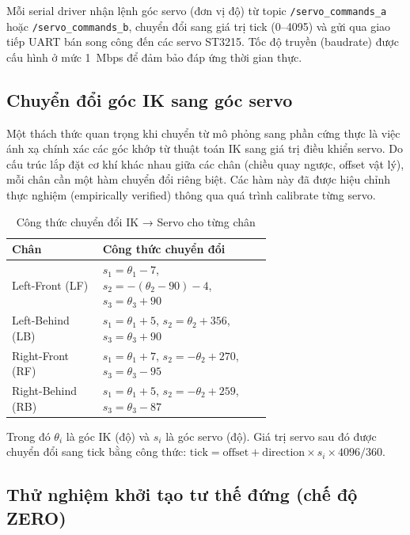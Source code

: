 Mỗi serial driver nhận lệnh góc servo (đơn vị độ) từ topic \texttt{/servo\_}\allowbreak\texttt{commands\_}\allowbreak\texttt{a} hoặc \texttt{/servo\_}\allowbreak\texttt{commands\_}\allowbreak\texttt{b}, chuyển đổi sang giá trị tick (0--4095) và gửi qua giao tiếp UART bán song công đến các servo ST3215. Tốc độ truyền (baudrate) được cấu hình ở mức 1~Mbps để đảm bảo đáp ứng thời gian thực.

\subsection{Chuyển đổi góc IK sang góc servo}

Một thách thức quan trọng khi chuyển từ mô phỏng sang phần cứng thực là việc ánh xạ chính xác các góc khớp từ thuật toán IK sang giá trị điều khiển servo. Do cấu trúc lắp đặt cơ khí khác nhau giữa các chân (chiều quay ngược, offset vật lý), mỗi chân cần một hàm chuyển đổi riêng biệt. Các hàm này đã được hiệu chỉnh thực nghiệm (empirically verified) thông qua quá trình calibrate từng servo.

\begin{table}[H]
\centering
\caption{Công thức chuyển đổi IK → Servo cho từng chân}
\label{tab:ik_to_servo}
\renewcommand{\arraystretch}{1.5}
\begin{tabular}{|l|p{0.65\linewidth}|}
\hline
\textbf{Chân} & \textbf{Công thức chuyển đổi} \\ \hline
Left-Front (LF) & $s_1 = \theta_1 - 7$, \quad $s_2 = -(\theta_2 - 90) - 4$, \quad $s_3 = \theta_3 + 90$ \\ \hline
Left-Behind (LB) & $s_1 = \theta_1 + 5$, \quad $s_2 = \theta_2 + 356$, \quad $s_3 = \theta_3 + 90$ \\ \hline
Right-Front (RF) & $s_1 = \theta_1 + 7$, \quad $s_2 = -\theta_2 + 270$, \quad $s_3 = \theta_3 - 95$ \\ \hline
Right-Behind (RB) & $s_1 = \theta_1 + 5$, \quad $s_2 = -\theta_2 + 259$, \quad $s_3 = \theta_3 - 87$ \\ \hline
\end{tabular}
\end{table}

Trong đó $\theta_i$ là góc IK (độ) và $s_i$ là góc servo (độ). Giá trị servo sau đó được chuyển đổi sang tick bằng công thức: $\text{tick} = \text{offset} + \text{direction} \times s_i \times 4096 / 360$.

\subsection{Thử nghiệm khởi tạo tư thế đứng (chế độ ZERO)}

